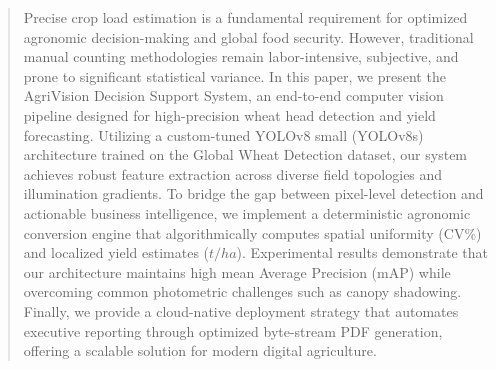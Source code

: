 \begin{abstract}
Precise crop load estimation is a fundamental requirement for optimized agronomic decision-making and global food security. However, traditional manual counting methodologies remain labor-intensive, subjective, and prone to significant statistical variance. In this paper, we present the AgriVision Decision Support System, an end-to-end computer vision pipeline designed for high-precision wheat head detection and yield forecasting. Utilizing a custom-tuned YOLOv8 small (YOLOv8s) architecture trained on the Global Wheat Detection dataset, our system achieves robust feature extraction across diverse field topologies and illumination gradients. To bridge the gap between pixel-level detection and actionable business intelligence, we implement a deterministic agronomic conversion engine that algorithmically computes spatial uniformity (CV\%) and localized yield estimates ($t/ha$). Experimental results demonstrate that our architecture maintains high mean Average Precision (mAP) while overcoming common photometric challenges such as canopy shadowing. Finally, we provide a cloud-native deployment strategy that automates executive reporting through optimized byte-stream PDF generation, offering a scalable solution for modern digital agriculture.
\end{abstract}